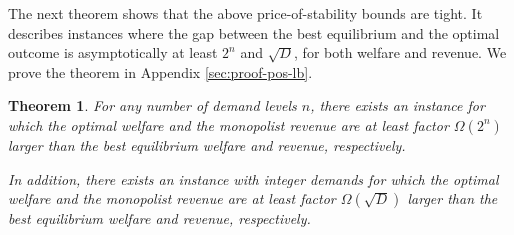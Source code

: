 \documentclass[11pt,a4paper]{article}
\newcommand{\ignore}[1]{}
\newtheorem{theorem}{Theorem}[section]
\begin{document}
The next theorem shows that the above price-of-stability bounds are tight.
It describes instances where the gap between the best equilibrium and the optimal outcome is asymptotically at least $2^n$ and $\sqrt{D}$, for both welfare and revenue.
We prove the theorem in Appendix \ref{sec:proof-pos-lb}.
%
\begin{theorem}
\label{thm:POS-LB}
For any number of demand levels $n$, there exists an instance for which
the optimal welfare and the monopolist revenue are at least factor $\Omega(2^n)$ larger than
the best equilibrium welfare and revenue, respectively.

In addition,
there exists an instance with integer demands for which
the optimal welfare and the monopolist revenue are at least factor $\Omega(\sqrt{D})$ larger than
the best equilibrium welfare and revenue, respectively.
\end{theorem}	

\ignore{ %
\begin{theorem}
	\label{thm:POS-n}
	Fix $\epsilon>0$.
	For any integer $n\geq 2$ there exist an instance $(\vec{v},\vec{d})$ with $n$ demand levels for which the best equilibrium has welfare and revenue of $1$, while the optimal welfare if at least $2^n - 1- \epsilon$ and the monopolist revenue is at least $2^{n-1}-\epsilon$.
	
	This is tight as for any instance $(\vec{v},\vec{d})$ with $n$ demand levels it holds that  the optimal welfare is at most factor $2^n -1$ larger than the welfare of the highest welfare equilibrium, and the revenue of the monopolist is at most factor $2^{n-1}$ larger than the total revenue of the highest revenue equilibrium.
\end{theorem}	
} %

\end{document}
